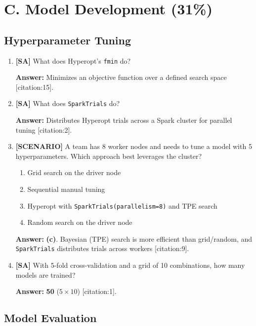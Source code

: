 \documentclass[11pt]{article}
\begin{document}
	\newpage
	\section{C. Model Development (31\%)}
	
	\subsection*{Hyperparameter Tuning}
	
	\begin{enumerate}[leftmargin=*, label=\textbf{Q\arabic*.}, start=23]
		
		\item \textbf{[SA]} What does Hyperopt's \texttt{fmin} do?
		
		\textbf{Answer:} Minimizes an objective function over a defined search space [citation:15].
		
		\item \textbf{[SA]} What does \texttt{SparkTrials} do?
		
		\textbf{Answer:} Distributes Hyperopt trials across a Spark cluster for parallel tuning [citation:2].
		
		\item \textbf{[SCENARIO]} A team has 8 worker nodes and needs to tune a model with 5 hyperparameters. Which approach best leverages the cluster?
		\begin{enumerate}[label=(\alph*)]
			\item Grid search on the driver node
			\item Sequential manual tuning
			\item Hyperopt with \texttt{SparkTrials(parallelism=8)} and TPE search
			\item Random search on the driver node
		\end{enumerate}
		
		\textbf{Answer:} \textbf{(c)}. Bayesian (TPE) search is more efficient than grid/random, and \texttt{SparkTrials} distributes trials across workers [citation:9].
		
		\item \textbf{[SA]} With 5-fold cross-validation and a grid of 10 combinations, how many models are trained?
		
		\textbf{Answer:} \textbf{50} ($5 \times 10$) [citation:1].
		
	\end{enumerate}
	
	\subsection*{Model Evaluation}
	
\end{document}
